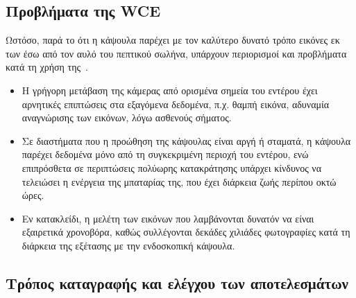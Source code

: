 \subsection{Προβλήματα της WCE}
 
   Ωστόσο, παρά το ότι η κάψουλα παρέχει με τον καλύτερο δυνατό τρόπο εικόνες εκ των έσω από τον αυλό του πεπτικού σωλήνα, υπάρχουν περιορισμοί και προβλήματα κατά τη χρήση της~\cite{website:medicinenet}.
   
     \begin{itemize}
    
   \item Η γρήγορη μετάβαση της κάμερας από ορισμένα σημεία του εντέρου έχει αρνητικές επιπτώσεις στα εξαγόμενα δεδομένα, π.χ. θαμπή εικόνα, 
 αδυναμία αναγνώρισης των εικόνων, λόγω ασθενούς σήματος.
   \item Σε διαστήματα που η προώθηση της κάψουλας είναι αργή ή σταματά, η κάψουλα παρέχει δεδομένα μόνο από τη συγκεκριμένη περιοχή του εντέρου, ενώ επιπρόσθετα σε περιπτώσεις πολύωρης κατακράτησης υπάρχει κίνδυνος να 
τελειώσει η ενέργεια της μπαταρίας της, που έχει διάρκεια ζωής περίπου οκτώ ώρες.
   \item Εν κατακλείδι, η μελέτη των εικόνων που λαμβάνονται δυνατόν να είναι εξαιρετικά χρονοβόρα, καθώς συλλέγονται δεκάδες χιλιάδες φωτογραφίες κατά τη διάρκεια της εξέτασης με την ενδοσκοπική κάψουλα. 
 
 
  \end{itemize}

   
\subsection{Τρόπος καταγραφής και ελέγχου των αποτελεσμάτων}


